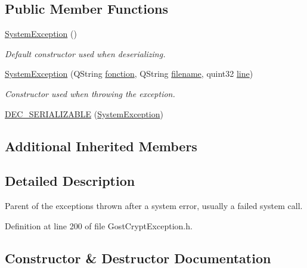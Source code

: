 \subsection*{Public Member Functions}
\begin{DoxyCompactItemize}
\item 
\hyperlink{class_gost_crypt_1_1_system_exception_a9f157c188a46742a86c0d14731f4f055}{System\+Exception} ()
\begin{DoxyCompactList}\small\item\em Default constructor used when deserializing. \end{DoxyCompactList}\item 
\hyperlink{class_gost_crypt_1_1_system_exception_a631e099e6814af9b891c4cf3d0bc8e19}{System\+Exception} (Q\+String \hyperlink{class_gost_crypt_1_1_gost_crypt_exception_a29b8c93d5efbb1ff369107385725a939}{fonction}, Q\+String \hyperlink{class_gost_crypt_1_1_gost_crypt_exception_a749a12375f4ba9d502623b99d8252f38}{filename}, quint32 \hyperlink{class_gost_crypt_1_1_gost_crypt_exception_abf506d911f12a4e969eea500f90bd32c}{line})
\begin{DoxyCompactList}\small\item\em Constructor used when throwing the exception. \end{DoxyCompactList}\item 
\hyperlink{class_gost_crypt_1_1_system_exception_a5f7e152f04292aadf42f53f183bd56f3}{D\+E\+C\+\_\+\+S\+E\+R\+I\+A\+L\+I\+Z\+A\+B\+LE} (\hyperlink{class_gost_crypt_1_1_system_exception}{System\+Exception})
\end{DoxyCompactItemize}
\subsection*{Additional Inherited Members}


\subsection{Detailed Description}
Parent of the exceptions thrown after a system error, usually a failed system call. 

Definition at line 200 of file Gost\+Crypt\+Exception.\+h.



\subsection{Constructor \& Destructor Documentation}
\mbox{\label{class_gost_crypt_1_1_system_exception_a9f157c188a46742a86c0d14731f4f055}} 
